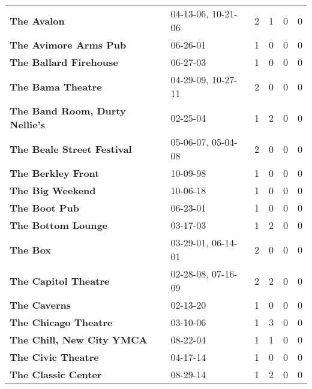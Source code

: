 \begin{supertabular}{p{0.4\textwidth}p{0.3\textwidth}p{0.05\textwidth}p{0.05\textwidth}p{0.05\textwidth}p{0.05\textwidth}}
                                                  \textbf{The Avalon} &  04-13-06, 10-21-06 &  2 &  1 &  0 &  0 \\
                                        \textbf{The Avimore Arms Pub} &            06-26-01 &  1 &  0 &  0 &  0 \\
                                       \textbf{The Ballard Firehouse} &            06-27-03 &  1 &  0 &  0 &  0 \\
                                            \textbf{The Bama Theatre} &  04-29-09, 10-27-11 &  2 &  0 &  0 &  0 \\
                               \textbf{The Band Room, Durty Nellie's} &            02-25-04 &  1 &  2 &  0 &  0 \\
                                   \textbf{The Beale Street Festival} &  05-06-07, 05-04-08 &  2 &  0 &  0 &  0 \\
                                           \textbf{The Berkley Front} &            10-09-98 &  1 &  0 &  0 &  0 \\
                                             \textbf{The Big Weekend} &            10-06-18 &  1 &  0 &  0 &  0 \\
                                                \textbf{The Boot Pub} &            06-23-01 &  1 &  0 &  0 &  0 \\
                                           \textbf{The Bottom Lounge} &            03-17-03 &  1 &  2 &  0 &  0 \\
                                                     \textbf{The Box} &  03-29-01, 06-14-01 &  2 &  0 &  0 &  0 \\
                                         \textbf{The Capitol Theatre} &  02-28-08, 07-16-09 &  2 &  2 &  0 &  0 \\
                                                 \textbf{The Caverns} &            02-13-20 &  1 &  0 &  0 &  0 \\
                                         \textbf{The Chicago Theatre} &            03-10-06 &  1 &  3 &  0 &  0 \\
                                    \textbf{The Chill, New City YMCA} &            08-22-04 &  1 &  1 &  0 &  0 \\
                                           \textbf{The Civic Theatre} &            04-17-14 &  1 &  0 &  0 &  0 \\
                                          \textbf{The Classic Center} &            08-29-14 &  1 &  2 &  0 &  0 \\

\end{supertabular}
